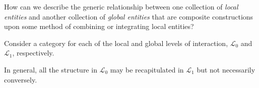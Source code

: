 \begin{frame}
\begin{block}{}
How can we describe the generic relationship between one collection of {\it local entities} and another collection of {\it global entities} that are composite constructions upon some method of combining or integrating local entities?
\end{block}
\pause \begin{block}{}
Consider a category for each of the local and global levels of interaction, $\mathcal{L}_0$ and $\mathcal{L}_1$, respectively. 
\end{block}
\pause \begin{block}{}
In general, all the structure in $\mathcal{L}_0$ may be recapitulated in $\mathcal{L}_1$ but not necessarily conversely.
\end{block}
\end{frame}